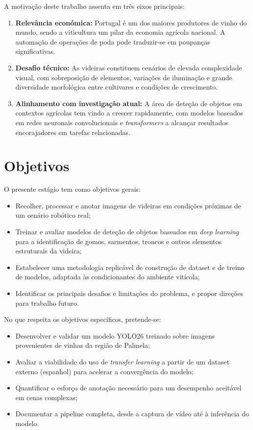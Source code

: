 A motivação deste trabalho assenta em três eixos principais:

\begin{enumerate}
  \item \textbf{Relevância económica:} Portugal é um dos maiores produtores
    de vinho do mundo, sendo a viticultura um pilar da economia agrícola
    nacional. A automação de operações de poda pode traduzir-se em poupanças
    significativas.

  \item \textbf{Desafio técnico:} As videiras constituem cenários de elevada
    complexidade visual, com sobreposição de elementos, variações de
    iluminação e grande diversidade morfológica entre cultivares e condições
    de crescimento.

  \item \textbf{Alinhamento com investigação atual:} A área de deteção de
    objetos em contextos agrícolas tem vindo a crescer rapidamente, com
    modelos baseados em redes neuronais convolucionais e \textit{transformers}
    a alcançar resultados encorajadores em tarefas relacionadas.
\end{enumerate}

\section{Objetivos}

O presente estágio tem como objetivos gerais:

\begin{itemize}
  \item Recolher, processar e anotar imagens de videiras em condições
    próximas de um cenário robótico real;
  \item Treinar e avaliar modelos de deteção de objetos baseados em
    \textit{deep learning} para a identificação de gomos, sarmentos,
    troncos e outros elementos estruturais da videira;
  \item Estabelecer uma metodologia replicável de construção de dataset e
    de treino de modelos, adaptada às condicionantes do ambiente vitícola;
  \item Identificar os principais desafios e limitações do problema, e
    propor direções para trabalho futuro.
\end{itemize}

No que respeita os objetivos específicos, pretende-se:

\begin{itemize}
  \item Desenvolver e validar um modelo YOLO26 treinado sobre imagens
    provenientes de vinhas da região de Palmela;
  \item Avaliar a viabilidade do uso de \textit{transfer learning} a partir
    de um dataset externo (espanhol) para acelerar a convergência do modelo;
  \item Quantificar o esforço de anotação necessário para um desempenho
    aceitável em cenas complexas;
  \item Documentar a pipeline completa, desde a captura de vídeo até à
    inferência do modelo.
\end{itemize}

